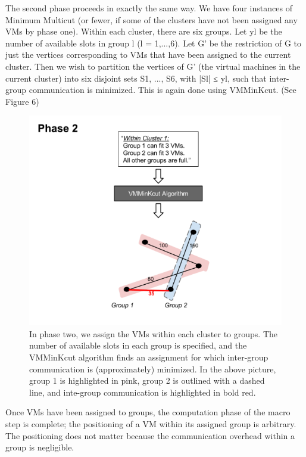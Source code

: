 \documentclass[11pt]{article}
\begin{document}
The second phase proceeds in exactly the same way.  We have four instances of Minimum Multicut (or fewer, if some of the clusters have not been assigned any VMs by phase one).  Within each cluster, there are six groups.  Let yl be the number of available slots in group l (l = 1,...,6).  Let G' be the restriction of G to just the vertices corresponding to VMs that have been assigned to the current cluster.  Then we wish to partition the vertices of G' (the virtual machines in the current cluster) into six disjoint sets S1, ..., S6, with |Sl| ≤ yl, such that inter-group communication is minimized.  This is again done using VMMinKcut.  (See Figure 6)

\begin{figure}
  \centering
\includegraphics[scale=0.7]{phase2.png}

 \caption{In phase two, we assign the VMs within each cluster to groups.  The number of available slots in each group is specified, and the VMMinKcut algorithm finds an assignment for which inter-group communication is (approximately) minimized.  In the above picture, group 1 is highlighted in pink, group 2 is outlined with a dashed line, and inte-group communication is highlighted in bold red.}

\end{figure}

Once VMs have been assigned to groups, the computation phase of the macro step is complete; the positioning of a VM within its assigned group is arbitrary.  The positioning does not matter because the communication overhead within a group is negligible.
\end{document}
